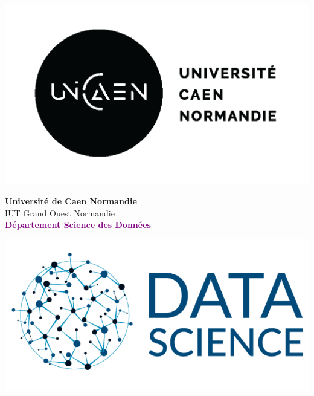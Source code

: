 \documentclass[$if(fontsize)$$fontsize$,$endif$]{article}
\begin{document}

\begin{center}

\begin{minipage}[c]{0.15\textwidth}
\includegraphics[scale=0.2]{logo-UNICAEN}
\end{minipage}
\begin{minipage}[c]{0.6\textwidth}
\begin{center}
{\Large \bf Université de Caen Normandie}\\[0.2cm]
{\large \rm IUT Grand Ouest Normandie}\\[0.2cm]
\textcolor{purple}{\bf Département Science des Données}
\end{center}
\end{minipage}
\begin{minipage}[c]{0.15\textwidth}
\includegraphics[scale=0.14]{Data-Science}
\end{minipage}

\end{center}

\vspace{0.5cm}
\end{document}
